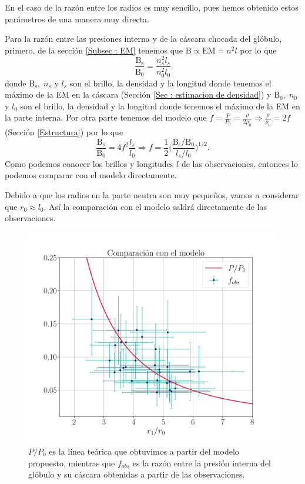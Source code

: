 \documentclass{book}
\begin{document}
En el caso de la razón entre los radios es muy sencillo, pues hemos obtenido estos parámetros de una manera muy directa.

Para la razón entre las presiones interna y de la cáscara chocada del glóbulo, primero, de la sección \ref{Subsec : EM} tenemos que $\mathrm{B}\propto \mathrm{EM}=n^2l$ por lo que
\[\frac{\mathrm{B_s}}{\mathrm{B_0}}=\frac{n_s^2l_s}{n_0^2l_0}\]
donde $\mathrm{B_s}, \; n_s$ y $l_s$ son el brillo, la densidad y la longitud donde tenemos el máximo de la EM en la cáscara (Sección \ref{Sec : estimacion de densidad}) y  $\mathrm{B_0}, \; n_0$ y $l_0$ son el brillo, la densidad y la longitud donde tenemos el máximo de la EM en la parte interna. Por otra parte tenemos del modelo que $f = \frac{P}{P_0}=\frac{\rho}{2\rho_0} \Rightarrow \frac{\rho}{\rho_0}=2f$ (Sección \ref{Estructura}) por lo que
\[\frac{\mathrm{B_s}}{\mathrm{B_0}}=4f^2\frac{l_s}{l_0}\Rightarrow f= \frac{1}{2}\Big(\frac{\mathrm{B_s}/\mathrm{B_0}}{l_s/l_0}\Big)^{1/2}.\]  Como podemos conocer los brillos y longitudes $l$ de las observaciones, entonces lo podemos comparar con el modelo directamente.

Debido a que los radios en la parte neutra son muy pequeños, vamos a considerar que $r_0\approx l_0$. Así la comparación con el modelo saldrá directamente de las observaciones. 

\begin{figure}[htb]
    \centering
    \includegraphics[width=\textwidth]{Nuevas imagenes finales/R_2.pdf}
    \caption{$P/P_0$ es la línea teórica que obtuvimos a partir del modelo propuesto, mientras que $f_{obs}$ es la razón entre la presión interna del glóbulo y su cáscara obtenidas a partir de las observaciones.}
    \label{Resultados_modelo}
\end{figure}
\end{document}
